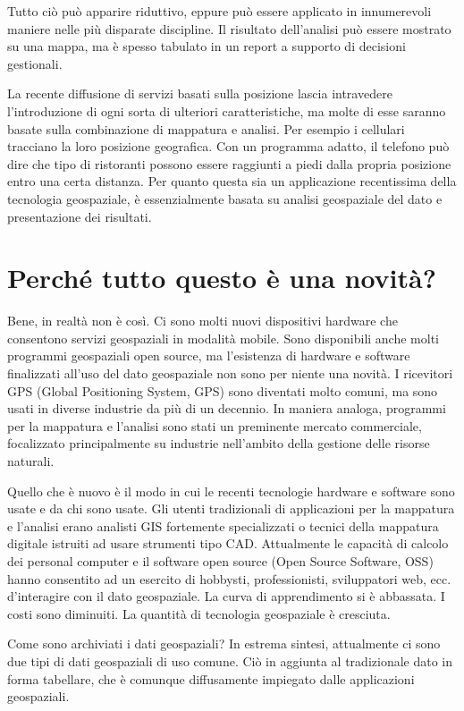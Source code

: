 Tutto ciò può apparire riduttivo, eppure può essere applicato in innumerevoli
maniere nelle più disparate discipline. Il risultato dell'analisi può essere
mostrato su una mappa, ma è spesso tabulato in un report a supporto
di decisioni gestionali.

La recente diffusione di servizi basati sulla posizione lascia intravedere
l'introduzione di ogni sorta di ulteriori caratteristiche, ma molte
di esse saranno basate sulla combinazione di mappatura e analisi.
Per esempio i cellulari tracciano la loro posizione geografica. Con
un programma adatto, il telefono può dire che tipo di ristoranti possono
essere raggiunti a piedi dalla propria posizione entro una certa distanza.
Per quanto questa sia un applicazione recentissima della tecnologia geospaziale,
è essenzialmente basata su analisi geospaziale del dato e presentazione
dei risultati.

\section{Perché tutto questo è una novità?}\label{label_whynew}

Bene, in realtà non è così. Ci sono molti nuovi dispositivi hardware
che consentono servizi geospaziali in modalità mobile. Sono disponibili
anche molti programmi geospaziali open source, ma l'esistenza di hardware
e software finalizzati all'uso del dato geospaziale non sono per niente una
novità. I ricevitori GPS (Global Positioning System, GPS) sono diventati
molto comuni, ma sono usati in diverse industrie da più di un decennio.
In maniera analoga, programmi per la mappatura e l'analisi sono stati
un preminente mercato commerciale, focalizzato principalmente su industrie
nell'ambito della gestione delle risorse naturali.

Quello che è nuovo è il modo in cui le recenti tecnologie hardware e software 
sono usate e da chi sono usate. Gli utenti tradizionali di applicazioni
per la mappatura e l'analisi erano analisti GIS fortemente specializzati
o tecnici della mappatura digitale istruiti ad usare strumenti tipo
CAD. Attualmente le capacità di calcolo dei personal computer e il software
open source (Open Source Software, OSS) hanno consentito ad un esercito
di hobbysti, professionisti, sviluppatori web, ecc. d'interagire
con il dato geospaziale. La curva di apprendimento si è abbassata.
I costi sono diminuiti. La quantità di tecnologia geospaziale è cresciuta.

Come sono archiviati i dati geospaziali? In estrema sintesi, attualmente ci sono
due tipi di dati geospaziali di uso comune. Ciò in aggiunta
al tradizionale dato in forma tabellare, che è comunque diffusamente
impiegato dalle applicazioni geospaziali.

